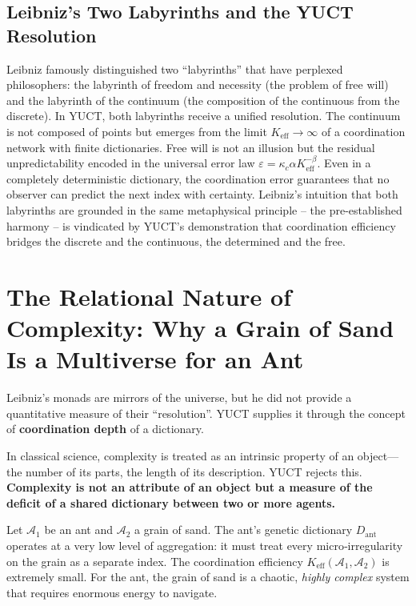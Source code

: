 \documentclass[12pt,a4paper]{article}
\newcommand{\Keff}{K_{\mathrm{eff}}}
\begin{document}
	\subsection{Leibniz's Two Labyrinths and the YUCT Resolution}
	
	Leibniz famously distinguished two ``labyrinths'' that have perplexed philosophers: the labyrinth of freedom and necessity (the problem of free will) and the labyrinth of the continuum (the composition of the continuous from the discrete). In YUCT, both labyrinths receive a unified resolution. The continuum is not composed of points but emerges from the limit \(K_{\mathrm{eff}} \to \infty\) of a coordination network with finite dictionaries. Free will is not an illusion but the residual unpredictability encoded in the universal error law \(\varepsilon = \kappa_c \alpha K_{\mathrm{eff}}^{-\beta}\). Even in a completely deterministic dictionary, the coordination error guarantees that no observer can predict the next index with certainty. Leibniz's intuition that both labyrinths are grounded in the same metaphysical principle -- the pre-established harmony -- is vindicated by YUCT's demonstration that coordination efficiency bridges the discrete and the continuous, the determined and the free.
	
	\section{The Relational Nature of Complexity: Why a Grain of Sand Is a Multiverse for an Ant}
	\label{sec:relational-complexity}
	
	Leibniz’s monads are mirrors of the universe, but he did not provide a quantitative measure of their ``resolution''. YUCT supplies it through the concept of \textbf{coordination depth} of a dictionary.
	
	In classical science, complexity is treated as an intrinsic property of an object---the number of its parts, the length of its description. YUCT rejects this. \textbf{Complexity is not an attribute of an object but a measure of the deficit of a shared dictionary between two or more agents.}
	
	Let \(\mathcal{A}_1\) be an ant and \(\mathcal{A}_2\) a grain of sand. The ant’s genetic dictionary \(D_{\text{ant}}\) operates at a very low level of aggregation: it must treat every micro‑irregularity on the grain as a separate index. The coordination efficiency \(\Keff(\mathcal{A}_1, \mathcal{A}_2)\) is extremely small. For the ant, the grain of sand is a chaotic, \emph{highly complex} system that requires enormous energy to navigate.
	
\end{document}
